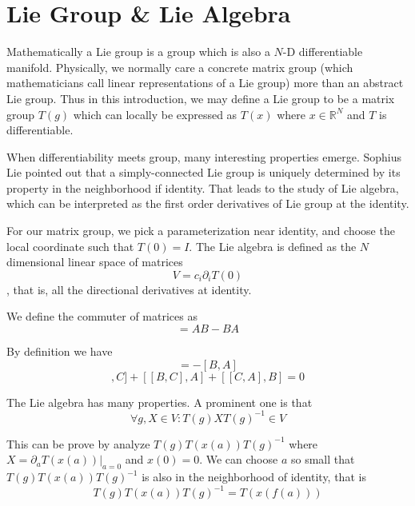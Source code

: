 \documentclass[12pt]{book}
\begin{document}
	\chapter{Lie Group \& Lie Algebra}
	
	Mathematically a Lie group is a group which is also a $N$-D differentiable manifold. Physically, we normally care a concrete matrix group (which mathematicians call linear representations of a Lie group) more than an abstract Lie group. Thus in this introduction, we may define a Lie group to be a matrix group $T(g)$ which can locally be expressed as $T(x)$ where $x\in\mathbb R^N$ and $T$ is differentiable.
	
	When differentiability meets group, many interesting properties emerge. Sophius Lie pointed out that a simply-connected Lie group is uniquely determined by its property in the neighborhood if identity. That leads to the study of Lie algebra, which can be interpreted as the first order derivatives of Lie group at the identity.
	
	For our matrix group, we pick a parameterization near identity, and choose the local coordinate such that $T(0)=I$. The Lie algebra is defined as the $N$ dimensional linear space of matrices
	\begin{equation}
		V=c_i\partial_iT(0)
	\end{equation},
	that is, all the directional derivatives at identity.
	
	We define the commuter of matrices as
	\begin{equation}
		[A,B]=AB-BA
	\end{equation}
	
	By definition we have
	\begin{equation}
		[A,B]=-[B,A]
	\end{equation}
	\begin{equation}
		[[A,B],C]+[[B,C],A]+[[C,A],B]=0
	\end{equation}
	
	The Lie algebra has many properties. A prominent one is that 
	\begin{equation}
		\forall g,X\in V: T(g)XT(g)^{-1}\in V
	\end{equation}
	
	This can be prove by analyze $T(g)T(x(a))T(g)^{-1}$ where $X=\partial_aT(x(a))|_{a=0}$ and $x(0)=0$. We can choose $a$ so small that $T(g)T(x(a))T(g)^{-1}$ is also in the neighborhood of identity, that is 
	\begin{equation}
		T(g)T(x(a))T(g)^{-1}=T(x(f(a)))
	\end{equation}
	
\end{document}
